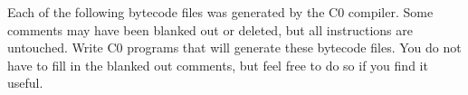 \clearpage
{}

Each of the following bytecode files was generated by the C0 compiler.
Some comments may have been blanked out or deleted, but all
instructions are untouched.  Write C0 programs that will generate
these bytecode files.  You do not have to fill in the blanked out
comments, but feel free to do so if you find it useful.

\begin{parts}

\newpage

\end{parts}